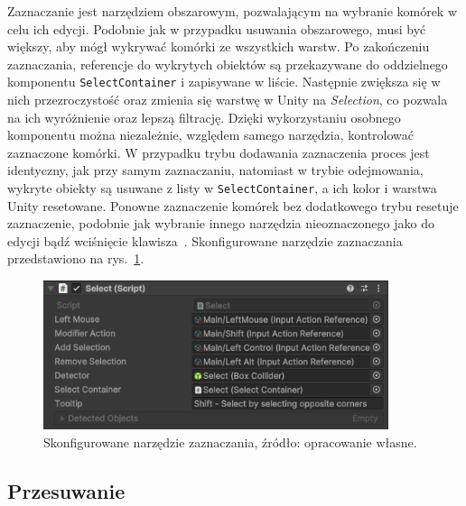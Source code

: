 Zaznaczanie jest narzędziem obszarowym, pozwalającym na wybranie komórek w celu ich edycji.
Podobnie jak w przypadku usuwania obszarowego,
 musi być większy,
aby mógł wykrywać komórki ze wszystkich warstw.
Po zakończeniu zaznaczania,
referencje do wykrytych obiektów są przekazywane do oddzielnego komponentu \texttt{SelectContainer}
i zapisywane w liście.
Następnie zwiększa się w nich przezroczystość oraz zmienia się warstwę w Unity na \textit{Selection},
co pozwala na ich wyróżnienie oraz lepszą filtrację.
Dzięki wykorzystaniu osobnego komponentu można niezależnie,
względem samego narzędzia,
kontrolować zaznaczone komórki.
W przypadku trybu dodawania zaznaczenia proces jest identyczny, jak przy samym zaznaczaniu,
natomiast w trybie odejmowania,
wykryte obiekty są usuwane z listy w \texttt{SelectContainer}, a ich kolor i warstwa Unity resetowane.
Ponowne zaznaczenie komórek bez dodatkowego trybu resetuje zaznaczenie,
podobnie jak wybranie innego narzędzia nieoznaczonego jako do edycji bądź wciśnięcie klawisza~.
Skonfigurowane narzędzie zaznaczania przedstawiono na rys.~\ref{fig:select}.

\begin{figure}[h!]
    \centering
    \includegraphics[width=0.9\textwidth]{chapters/chapter4/rys/tools/select}
    \caption[Skonfigurowane narzędzie zaznaczania.]{Skonfigurowane narzędzie zaznaczania, źródło: opracowanie własne.}
    \label{fig:select}
\end{figure}

\subsection{Przesuwanie}
\label{subsec:przesuwanie}

